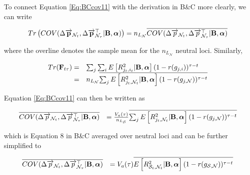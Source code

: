 \documentclass[12pt]{article}
\begin{document}
\begin{bibunit}
To connect Equation \ref{Eq:BCcov11} with the derivation in B\&C more clearly, we can write 

\begin{equation}
Tr\left(COV(\Delta \overrightarrow{\bf p}_{{\mathcal N}_t}, \Delta \overrightarrow{\bf p}_{{\mathcal N}_{\tau}}^\top | {\bf B}, \boldsymbol{\alpha}) \right)=n_{L_\mathcal{N}}\overline{COV(\Delta \overrightarrow{p}_{{\mathcal N}_t}, \Delta \overrightarrow{p}_{{\mathcal N}_{\tau}}^\top | {\bf B}, \boldsymbol{\alpha})}
\end{equation}

where the overline denotes the sample mean for the $n_{L_\mathcal{N}}$ neutral loci. Similarly, 

\begin{equation}
\begin{array}{rl}
Tr({\bf F}_{t\tau}) =& \sum_j\sum_i E\left[R_{j_t,i_t}^2 | {\bf B}, \boldsymbol{\alpha}\right](1-r(g_{j,i}))^{\tau-t}\\
=&n_{L_\mathcal{N}}\overline{\sum_jE\left[R_{j_t,{\mathcal N}_t}^2 | {\bf B}, \boldsymbol{\alpha}\right](1-r(g_{j,{\mathcal N}}))^{\tau-t}}\\
\end{array}
\end{equation}

Equation \ref{Eq:BCcov11} can then be written as

\begin{equation}
\begin{array}{rl}
\overline{COV(\Delta \overrightarrow{p}_{{\mathcal N}_t}, \Delta \overrightarrow{p}_{{\mathcal N}_{\tau}}^\top | {\bf B}, \boldsymbol{\alpha})}&=
\frac{V_a(\tau)}{n_{L_\mathcal{S}}}\overline{\sum_jE\left[R_{j_t,{\mathcal N}_t}^2 | {\bf B}, \boldsymbol{\alpha}\right](1-r(g_{j,{\mathcal N}}))^{\tau-t}}\\
\end{array}
\label{Eq:BCcov12}
\end{equation}

which is Equation 8 in B\&C averaged over neutral loci and can be further simplified to

\begin{equation}
\begin{array}{rl}
\overline{COV(\Delta \overrightarrow{p}_{{\mathcal N}_t}, \Delta \overrightarrow{p}_{{\mathcal N}_{\tau}}^\top | {\bf B}, \boldsymbol{\alpha})}&=
V_a(\tau)\overline{E\left[R_{{\mathcal S}_t,{\mathcal N}_t}^2 | {\bf B}, \boldsymbol{\alpha}\right](1-r(g_{{\mathcal S},{\mathcal N}}))^{\tau-t}}\\
\end{array}
\label{Eq:BCcov13}
\end{equation}


\end{bibunit}
\end{document}
